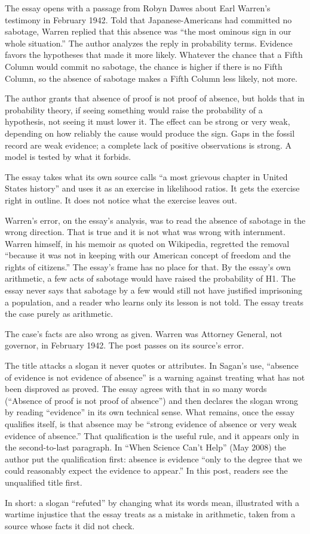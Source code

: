 \begin{afterword}
\summaryhead

The essay opens with a passage from Robyn Dawes about Earl Warren's testimony in February 1942. Told that Japanese-Americans had committed no sabotage, Warren replied that this absence was ``the most ominous sign in our whole situation.'' The author analyzes the reply in probability terms. Evidence favors the hypotheses that made it more likely. Whatever the chance that a Fifth Column would commit no sabotage, the chance is higher if there is no Fifth Column, so the absence of sabotage makes a Fifth Column less likely, not more.

The author grants that absence of proof is not proof of absence, but holds that in probability theory, if seeing something would raise the probability of a hypothesis, not seeing it must lower it. The effect can be strong or very weak, depending on how reliably the cause would produce the sign. Gaps in the fossil record are weak evidence; a complete lack of positive observations is strong. A model is tested by what it forbids.

\responsehead

The essay takes what its own source calls ``a most grievous chapter in United States history'' and uses it as an exercise in likelihood ratios. It gets the exercise right in outline. It does not notice what the exercise leaves out.

Warren's error, on the essay's analysis, was to read the absence of sabotage in the wrong direction. That is true and it is not what was wrong with internment. Warren himself, in his memoir as quoted on Wikipedia, regretted the removal ``because it was not in keeping with our American concept of freedom and the rights of citizens.'' The essay's frame has no place for that. By the essay's own arithmetic, a few acts of sabotage would have raised the probability of H1. The essay never says that sabotage by a few would still not have justified imprisoning a population, and a reader who learns only its lesson is not told. The essay treats the case purely as arithmetic.

The case's facts are also wrong as given. Warren was Attorney General, not governor, in February 1942. The post passes on its source's error.

The title attacks a slogan it never quotes or attributes. In Sagan's use, ``absence of evidence is not evidence of absence'' is a warning against treating what has not been disproved as proved. The essay agrees with that in so many words (``Absence of proof is not proof of absence'') and then declares the slogan wrong by reading ``evidence'' in its own technical sense. What remains, once the essay qualifies itself, is that absence may be ``strong evidence of absence or very weak evidence of absence.'' That qualification is the useful rule, and it appears only in the second-to-last paragraph. In ``When Science Can't Help'' (May 2008) the author put the qualification first: absence is evidence ``only to the degree that we could reasonably expect the evidence to appear.'' In this post, readers see the unqualified title first.

In short: a slogan ``refuted'' by changing what its words mean, illustrated with a wartime injustice that the essay treats as a mistake in arithmetic, taken from a source whose facts it did not check.
\end{afterword}
